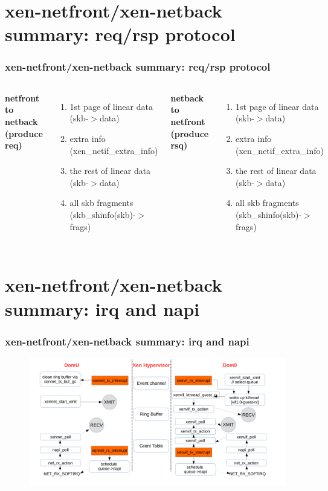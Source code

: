 \documentclass[aspectratio=169]{beamer}
\begin{document}

\section{xen-netfront/xen-netback summary: req/rsp protocol}
\begin{frame}
\frametitle{xen-netfront/xen-netback summary: req/rsp protocol}
\begin{columns}[c]
\begin{center} \textbf{netfront to netback (produce req)} \end{center}
\begin{enumerate}
\item 1st page of linear data (skb-$>$data)
\item extra info (xen\_netif\_extra\_info)
\item the rest of linear data (skb-$>$data)
\item all skb fragments (skb\_shinfo(skb)-$>$frags)
\end{enumerate}
\begin{center} \textbf{netback to netfront (produce rsq)} \end{center}
\begin{enumerate}
\item 1st page of linear data (skb-$>$data)
\item extra info (xen\_netif\_extra\_info)
\item the rest of linear data (skb-$>$data) 
\item all skb fragments (skb\_shinfo(skb)-$>$frags)
\end{enumerate}
\end{columns}
\end{frame}


\section{xen-netfront/xen-netback summary: irq and napi}
\begin{frame}
\frametitle{xen-netfront/xen-netback summary: irq and napi}
\begin{figure}
\includegraphics[width=1.0\linewidth]{figures/irq_napi.pdf}
\end{figure}
\end{frame}
\end{document}
